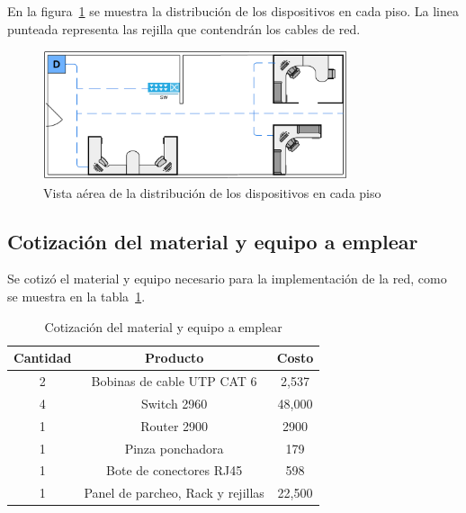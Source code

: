     En la figura~\ref{fig:plano_aereo} se muestra la distribución de los dispositivos en cada piso. La linea punteada representa las rejilla que contendrán los cables de red.

    \begin{figure}[H]
        \centering
        \includegraphics[width=0.8\textwidth]{img/planos.png}
        \caption{Vista aérea de la distribución de los dispositivos en cada piso}
        \label{fig:plano_aereo}
    \end{figure}

    \subsection{Cotización del material y equipo a emplear}

    Se cotizó el material y equipo necesario para la implementación de la red, como se muestra en la tabla~\ref{tab:costos}.
    
    \begin{table}[H]
        \begin{center}
            \begin{tabular}{ c | c | c  }
                \textbf{Cantidad} &\textbf{Producto} & \textbf{Costo}\\ \hline
                2 & Bobinas de cable UTP CAT 6 & 2,537\\
                4 & Switch 2960 & 48,000\\
                1 & Router 2900 & 2900\\
                1 & Pinza ponchadora & 179\\
                1 & Bote de conectores RJ45 & 598\\
                1 & Panel de parcheo, Rack y rejillas & 22,500\\ \hline
            \end{tabular}
            \caption{Cotización del material y equipo a emplear}
            \label{tab:costos}
        \end{center}
    \end{table}
    
